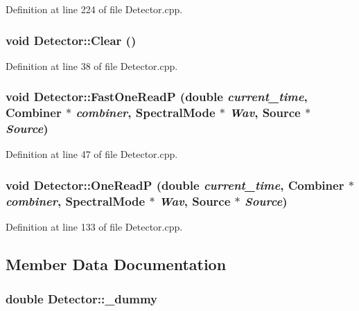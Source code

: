 Definition at line 224 of file Detector.cpp.

\hypertarget{classDetector_a57e174c4021b6a66f285ba63dfba1070}{
\subsubsection[{Clear}]{\setlength{\rightskip}{0pt plus 5cm}void Detector::Clear ()}}
\label{classDetector_a57e174c4021b6a66f285ba63dfba1070}


Definition at line 38 of file Detector.cpp.

\hypertarget{classDetector_adfc83c9c00ad09756eb5a26c167cbb62}{
\subsubsection[{FastOneReadP}]{\setlength{\rightskip}{0pt plus 5cm}void Detector::FastOneReadP (double {\em current\_\-time}, \/  {\bf Combiner} $\ast$ {\em combiner}, \/  {\bf SpectralMode} $\ast$ {\em Wav}, \/  {\bf Source} $\ast$ {\em Source})}}
\label{classDetector_adfc83c9c00ad09756eb5a26c167cbb62}


Definition at line 47 of file Detector.cpp.

\hypertarget{classDetector_a65dc093ac969e95438a8b8e29cf316f0}{
\subsubsection[{OneReadP}]{\setlength{\rightskip}{0pt plus 5cm}void Detector::OneReadP (double {\em current\_\-time}, \/  {\bf Combiner} $\ast$ {\em combiner}, \/  {\bf SpectralMode} $\ast$ {\em Wav}, \/  {\bf Source} $\ast$ {\em Source})}}
\label{classDetector_a65dc093ac969e95438a8b8e29cf316f0}


Definition at line 133 of file Detector.cpp.



\subsection{Member Data Documentation}
\hypertarget{classDetector_a2497faae45fc3b55e67c997f2b4cd29f}{
\subsubsection[{\_\-dummy}]{\setlength{\rightskip}{0pt plus 5cm}double {\bf Detector::\_\-dummy}}}
\label{classDetector_a2497faae45fc3b55e67c997f2b4cd29f}


